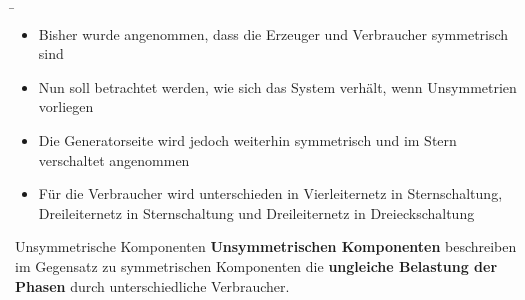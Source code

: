 \begin{frame}


\b{
    \begin{itemize}
        \item Bisher wurde angenommen, dass die Erzeuger und Verbraucher symmetrisch sind
        \item Nun soll betrachtet werden, wie sich das System verhält, wenn Unsymmetrien vorliegen
        \item Die Generatorseite wird jedoch weiterhin symmetrisch und im Stern verschaltet angenommen
        \item Für die Verbraucher wird unterschieden in Vierleiternetz in Sternschaltung, Dreileiternetz in Sternschaltung und Dreileiternetz in Dreieckschaltung
    \end{itemize}
}
\end{frame}

\begin{frame}

    \begin{Merksatz}{Unsymmetrische Komponenten}
        {\bf Unsymmetrischen Komponenten} beschreiben im Gegensatz zu symmetrischen Komponenten die {\bf ungleiche Belastung der 
        Phasen} durch unterschiedliche Verbraucher. 
    \end{Merksatz}
\end{frame}

